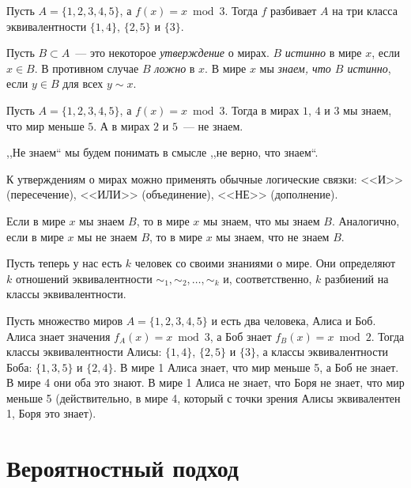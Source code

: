 \documentclass[12pt]{article}
\begin{document}
\begin{example}
    Пусть $A = \{1,2,3,4,5\}$, а $f(x) = x \bmod 3$. Тогда $f$ разбивает $A$ на три класса эквивалентности 
    $\{1,4\}$, $\{2,5\}$ и $\{3\}$.
\end{example}

Пусть $B\subset A$~--- это некоторое \emph{утверждение} о мирах. $B$ \emph{истинно} в мире $x$, если $x\in B$.
В противном случае $B$ \emph{ложно} в $x$. В мире $x$ мы \emph{знаем, что $B$ истинно}, если $y \in B$ для всех 
$y\sim x$.

\begin{example}
    Пусть $A = \{1,2,3,4,5\}$, а $f(x) = x \bmod 3$. Тогда в мирах $1$, $4$ и $3$ мы знаем, 
    что мир меньше $5$.  А в мирах $2$ и $5$~--- не знаем.
\end{example}
\begin{remark}
    ,,Не знаем`` мы будем понимать в смысле ,,не верно, что знаем``.
\end{remark}

К утверждениям о мирах можно применять обычные логические связки: <<И>> (пересечение), <<ИЛИ>> (объединение),
<<НЕ>> (дополнение).

\begin{statement}
    Если в мире $x$ мы знаем $B$, то в мире $x$ мы знаем, что мы знаем $B$.
    Аналогично, если в мире $x$ мы не знаем $B$, то в мире $x$ мы знаем, что не знаем $B$.
\end{statement}

Пусть теперь у нас есть $k$ человек со своими знаниями о мире. 
Они определяют $k$ отношений эквивалентности $\sim_1,\sim_2,\dotsc,\sim_k$ и,
соответственно, $k$ разбиений на классы эквивалентности.

\begin{example}
    Пусть множество миров $A = \{1,2,3,4,5\}$ и есть два человека, Алиса и Боб.
    Алиса знает значения $f_A(x) = x \bmod 3$, а Боб знает $f_B(x) = x\bmod 2$.
    Тогда классы эквивалентности Алисы: $\{1,4\}$, $\{2,5\}$ и $\{3\}$,
    а классы эквивалентности Боба:  $\{1,3,5\}$ и $\{2,4\}$.
    В мире 1 Алиса знает, что мир меньше 5, а Боб не знает. В мире 4 они оба это знают.
    В мире 1 Алиса не знает, что Боря не знает, что мир меньше 5 (действительно, в мире 4,
    который с точки зрения Алисы эквивалентен 1, Боря это знает).
\end{example}

\section{Вероятностный подход}
\end{document}
